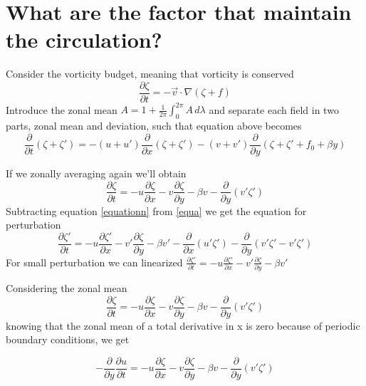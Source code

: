 \section{What are the factor that maintain the circulation?}
Consider the vorticity budget, meaning that vorticity is conserved
\begin{equation}
	\frac{\partial \zeta}{\partial t} = - \vec{v} \cdot \nabla (\zeta + f)
\end{equation}
Introduce the zonal mean $A = 1 + \frac{1}{2\pi} \int_0^{2\pi} A \, d\lambda$
and separate each field in two parts, zonal mean and deviation, such that equation above becomes
\begin{equation}\label{equa}
\frac{\partial}{\partial t} (\zeta + \zeta') = - (u + u') \frac{\partial}{\partial x} (\zeta + \zeta') - (v + v') \frac{\partial}{\partial y} (\zeta + \zeta' + f_0 + \beta y)
\end{equation}

If we zonally averaging again we'll obtain
\begin{equation}\label{equationn}
\frac{\partial \zeta}{\partial t} = - u \frac{\partial \zeta}{\partial x} - v \frac{\partial \zeta}{\partial y} - \beta v - \frac{\partial}{\partial y} (v' \zeta')
\end{equation}
Subtracting equation \ref{equationn} from \ref{equa} we get the equation for perturbation
\begin{equation}
	\frac{\partial \zeta'}{\partial t} = - u \frac{\partial \zeta'}{\partial x} - v' \frac{\partial \zeta}{\partial y} - \beta v' - \frac{\partial}{\partial x} (u' \zeta') - \frac{\partial}{\partial y} (v' \zeta' - v' \zeta')
\end{equation}
For small perturbation we can linearized $\frac{\partial \zeta'}{\partial t} = - u \frac{\partial \zeta'}{\partial x} - v' \frac{\partial \zeta}{\partial y} - \beta v'$



Considering the zonal mean
\begin{equation}
	\frac{\partial \zeta}{\partial t} = - u \frac{\partial \zeta}{\partial x} - v \frac{\partial \zeta}{\partial y} - \beta v - \frac{\partial}{\partial y} (v' \zeta')
\end{equation}
knowing that the zonal mean of a total derivative in x is zero because of
periodic boundary conditions, we get

\begin{equation}
	- \frac{\partial}{\partial y} \frac{\partial u}{\partial t} = - u \frac{\partial \zeta}{\partial x} - v \frac{\partial \zeta}{\partial y} - \beta v - \frac{\partial}{\partial y} (v' \zeta')
\end{equation}




